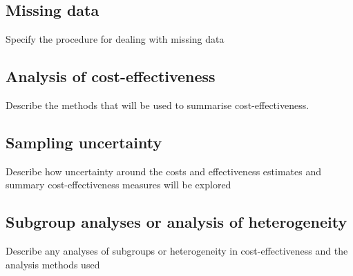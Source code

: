 \subsection{Missing data}

Specify the procedure for dealing with missing data



\subsection{Analysis of cost-effectiveness}

Describe the methods that will be used to summarise
cost-effectiveness.



\subsection{Sampling uncertainty}

Describe how uncertainty around the costs and effectiveness estimates
and summary cost-effectiveness measures will be explored



\subsection{Subgroup analyses or analysis of heterogeneity}

Describe any analyses of subgroups or heterogeneity in cost-effectiveness and the analysis methods used



